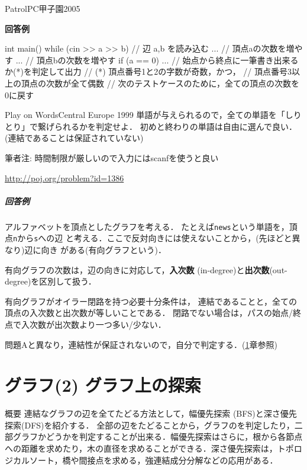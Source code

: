 \begin{versionalpha}
\begin{psbox}{Patrol}{PC甲子園2005}
\end{psbox}

\textbf{回答例}

\begin{cbox}
int main() {
    while (cin >> a >> b) { // 辺 a,b を読み込む
        ... // 頂点aの次数を増やす
        ... // 頂点bの次数を増やす
        if (a == 0) {
           ... // 始点から終点に一筆書き出来るか(*)を判定して出力
                // (*) 頂点番号1と2の字数が奇数，かつ，
                // 頂点番号3以上の頂点の次数が全て偶数
           // 次のテストケースのために，全ての頂点の次数を0に戻す
        }
    }
}
\end{cbox}

\begin{pbox}{Play on Words}{Central Europe 1999}
単語が与えられるので，全ての単語を「しりとり」で繋げられるかを判定せよ．
初めと終わりの単語は自由に選んで良い．
(連結であることは保証されていない)

筆者注: 時間制限が厳しいので入力にはscanfを使うと良い

\url{http://poj.org/problem?id=1386}  
\end{pbox}

\paragraph{回答例}
アルファベットを頂点としたグラフを考える．
たとえば\texttt{news}という単語を，頂点\texttt{n}から\texttt{s}への辺
と考える．ここで反対向きには使えないことから，(先ほどと異なり)辺に向き
がある(有向グラフという)．

有向グラフの次数は，辺の向きに対応して，\textbf{入次数} (in-degree)と\textbf{出次数}(out-degree)を区別して扱う．

有向グラフがオイラー閉路を持つ必要十分条件は，
連結であることと，全ての頂点の入次数と出次数が等しいことである．
閉路でない場合は，パスの始点/終点で入次数が出次数より一つ多い/少ない．

問題Aと異なり，連結性が保証されないので，自分で判定する．(\ref{section:graphsearch}章参照)
\end{versionalpha}
 \chapter{グラフ(2) グラフ上の探索}\label{section:graphsearch}

\begin{itembox}[l]{概要}
連結なグラフの辺を全てたどる方法として，幅優先探索 (BFS)と深さ優先探索(DFS)を紹介する．
全部の辺をたどることから，グラフのを判定したり，二部グラフかどうかを判定することが出来る．幅優先探索はさらに，根から各節点への距離を求めたり，木の直径を求めることができる．深さ優先探索は，トポロジカルソート，橋や間接点を求める，強連結成分分解などの応用がある．
\end{itembox}


